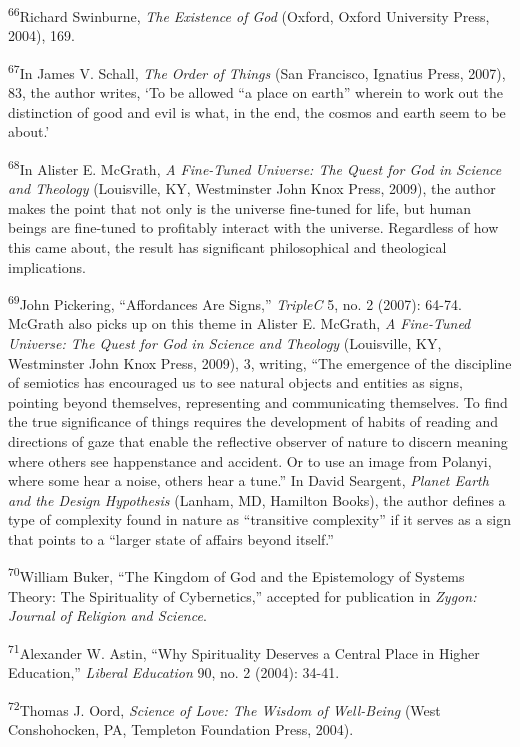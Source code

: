 \textsuperscript{66}Richard Swinburne, \textit{The Existence of God 
}(Oxford, Oxford University Press, 2004), 169.


\textsuperscript{67}In James V. Schall, \textit{The Order of Things
}(San Francisco, Ignatius Press, 2007), 83, the author writes, ‘To be
allowed “a place on earth” wherein to work out the distinction of good
and evil is what, in the end, the cosmos and earth seem to be about.’


\textsuperscript{68}In Alister E. McGrath, \textit{A Fine-Tuned
Universe: The Quest for God in Science and Theology }(Louisville, KY,
Westminster John Knox Press, 2009), the author makes the point that not
only is the universe fine-tuned for life, but human beings are
fine-tuned to profitably interact with the universe. Regardless of how
this came about, the result has significant philosophical and
theological implications.


\textsuperscript{69}John Pickering, “Affordances Are Signs,”
\textit{TripleC} 5, no. 2 (2007): 64-74. McGrath also picks up on this
theme in Alister E. McGrath, \textit{A Fine-Tuned Universe: The Quest
for God in Science and Theology }(Louisville, KY, Westminster John Knox
Press, 2009), 3, writing, “The emergence of the discipline of semiotics
has encouraged us to see natural objects and entities as signs,
pointing beyond themselves, representing and communicating themselves.
To find the true significance of things requires the development of
habits of reading and directions of gaze that enable the reflective
observer of nature to discern meaning where others see happenstance and
accident. Or to use an image from Polanyi, where some hear a noise,
others hear a tune.” In David Seargent, \textit{Planet Earth and the
Design Hypothesis} (Lanham, MD, Hamilton Books), the author defines a
type of complexity found in nature as “transitive complexity” if it
serves as a sign that points to a “larger state of affairs beyond
itself.”


\textsuperscript{70}William Buker, “The Kingdom of God and the
Epistemology of Systems Theory: The Spirituality of Cybernetics,”
accepted for publication in \textit{Zygon: Journal of Religion and
Science}.


\textsuperscript{71}Alexander W. Astin, “Why Spirituality Deserves a
Central Place in Higher Education,” \textit{Liberal Education} 90, no.
2 (2004): 34-41.


\textsuperscript{72}Thomas J. Oord, \textit{Science of Love: The Wisdom
of Well-Being }(West Conshohocken, PA, Templeton Foundation Press,
2004).


